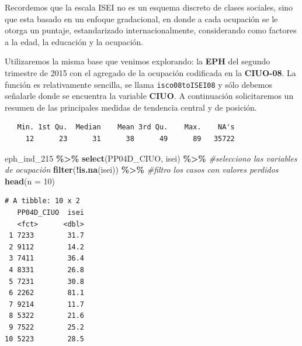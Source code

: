 \documentclass[
]{article}
\newenvironment{Shaded}{\begin{snugshade}}{\end{snugshade}}
\newcommand{\AttributeTok}[1]{\textcolor[rgb]{0.13,0.29,0.53}{#1}}
\newcommand{\CommentTok}[1]{\textcolor[rgb]{0.56,0.35,0.01}{\textit{#1}}}
\newcommand{\DecValTok}[1]{\textcolor[rgb]{0.00,0.00,0.81}{#1}}
\newcommand{\FunctionTok}[1]{\textcolor[rgb]{0.13,0.29,0.53}{\textbf{#1}}}
\newcommand{\NormalTok}[1]{#1}
\newcommand{\OtherTok}[1]{\textcolor[rgb]{0.56,0.35,0.01}{#1}}
\newcommand{\SpecialCharTok}[1]{\textcolor[rgb]{0.81,0.36,0.00}{\textbf{#1}}}
\begin{document}
Recordemos que la escala ISEI no es un esquema discreto de clases sociales, sino que esta basado en un enfoque gradacional, en donde a cada ocupación se le otorga un puntaje, estandarizado internacionalmente, considerando como factores a la edad, la educación y la ocupación.

Utilizaremos la misma base que venimos explorando: la \textbf{EPH} del segundo trimestre de 2015 con el agregado de la ocupación codificada en la \textbf{CIUO-08}. La función es relativamente sencilla, se llama \texttt{isco08toISEI08} y sólo debemos señalarle donde se encuentra la variable \textbf{CIUO}. A continuación solicitaremos un resumen de las principales medidas de tendencia central y de posición.

\begin{Shaded}
\end{Shaded}

\begin{verbatim}
   Min. 1st Qu.  Median    Mean 3rd Qu.    Max.    NA's 
     12      23      31      38      49      89   35722 
\end{verbatim}

\begin{Shaded}
\begin{Highlighting}[]
\NormalTok{eph\_ind\_215 }\SpecialCharTok{\%\textgreater{}\%} 
    \FunctionTok{select}\NormalTok{(PP04D\_CIUO, isei) }\SpecialCharTok{\%\textgreater{}\%} \CommentTok{\#selecciono las variables de ocupación}
    \FunctionTok{filter}\NormalTok{(}\SpecialCharTok{!}\FunctionTok{is.na}\NormalTok{(isei)) }\SpecialCharTok{\%\textgreater{}\%}  \CommentTok{\#filtro los casos con valores perdidos}
    \FunctionTok{head}\NormalTok{(}\AttributeTok{n =} \DecValTok{10}\NormalTok{)}
\end{Highlighting}
\end{Shaded}

\begin{verbatim}
# A tibble: 10 x 2
   PP04D_CIUO  isei
   <fct>      <dbl>
 1 7233        31.7
 2 9112        14.2
 3 7411        36.4
 4 8331        26.8
 5 7231        30.8
 6 2262        81.1
 7 9214        11.7
 8 5322        21.6
 9 7522        25.2
10 5223        28.5
\end{verbatim}
\end{document}

